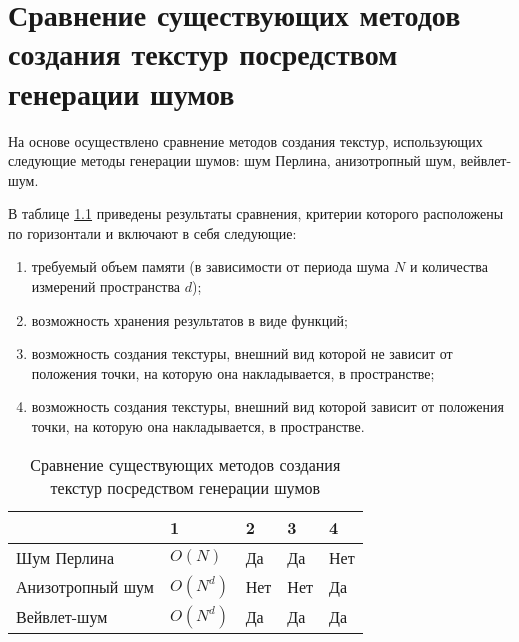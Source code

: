 \chapter{Сравнение существующих методов создания текстур посредством генерации шумов}

На основе \cite{survey} осуществлено сравнение методов создания текстур, использующих следующие методы генерации шумов: шум Перлина, анизотропный шум, вейвлет-шум.

В таблице \ref{tab:compare} приведены результаты сравнения, критерии которого расположены по горизонтали и включают в себя следующие:
\begin{enumerate}
	\item требуемый объем памяти (в зависимости от периода шума $N$ и количества измерений пространства $d$);
	\item возможность хранения результатов в виде функций;
	\item возможность создания текстуры, внешний вид которой не зависит от положения точки, на которую она накладывается, в пространстве;
	\item возможность создания текстуры, внешний вид которой зависит от положения точки, на которую она накладывается, в пространстве.
\end{enumerate}

\begin{table}[hbtp]
	\begin{center}
		\begin{flushleft}
			\caption{\label{tab:compare}Сравнение существующих методов создания текстур посредством генерации шумов}
		\end{flushleft}
		\begin{tabular}{|l | l | l | l | l |} 
			\hline 
			~					& {1}	            & {2} & {3} & {4} \\ \hline
			Шум Перлина         & \texttt{$O(N)$}   & Да  & Да  & Нет \\ \hline
			Анизотропный шум    & \texttt{$O(N^d)$} & Нет & Нет & Да  \\ \hline
			Вейвлет-шум         & \texttt{$O(N^d)$} & Да  & Да  & Да  \\ \hline
		\end{tabular}
	\end{center}
\end{table}